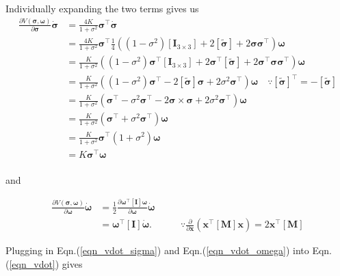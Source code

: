 \documentclass{article}
\begin{document}
Individually expanding the two terms gives us
\begin{equation}
  \label{eqn_vdot_sigma}
  \begin{split}
    \frac{\partial V(\bm{\sigma},\bm{\omega})}{\partial\bm{\sigma}}\dot{\bm{\sigma}}&=\frac{4K}{1+\sigma^{2}}\bm{\sigma}^{\intercal}\dot{\bm{\sigma}}\\
    &=\frac{4K}{1+\sigma^{2}}\bm{\sigma}^{\intercal}\frac{1}{4}\left((1-\sigma^{2})[\bm{I}_{3\times3}]+2[\tilde{\bm{\sigma}}]+2\bm{\sigma}\bm{\sigma}^{\intercal}\right)\bm{\omega}\\
    &=\frac{K}{1+\sigma^{2}}\left((1-\sigma^{2})\bm{\sigma}^{\intercal}[\bm{I}_{3\times3}]+2\bm{\sigma}^{\intercal}[\tilde{\bm{\sigma}}]+2\bm{\sigma}^{\intercal}\bm{\sigma}\bm{\sigma}^{\intercal}\right)\bm{\omega}\\
    &=\frac{K}{1+\sigma^{2}}\left((1-\sigma^{2})\bm{\sigma}^{\intercal}-2[\tilde{\bm{\sigma}}]\bm{\sigma}+2\sigma^{2}\bm{\sigma}^{\intercal}\right)\bm{\omega}\quad\because[\tilde{\bm{\sigma}}]^{\intercal}=-[\tilde{\bm{\sigma}}]\\
    &=\frac{K}{1+\sigma^{2}}\left(\bm{\sigma}^{\intercal}-\sigma^{2}\bm{\sigma}^{\intercal}-2\bm{\sigma}\times\bm{\sigma}+2\sigma^{2}\bm{\sigma}^{\intercal}\right)\bm{\omega}\\
    &=\frac{K}{1+\sigma^{2}}\left(\bm{\sigma}^{\intercal}+\sigma^{2}\bm{\sigma}^{\intercal}\right)\bm{\omega}\\
    &=\frac{K}{1+\sigma^{2}}\bm{\sigma}^{\intercal}\left(1+\sigma^{2}\right)\bm{\omega}\\
    &=K\bm{\sigma}^{\intercal}\bm{\omega}\\
  \end{split}
\end{equation}

and

\begin{equation}
  \label{eqn_vdot_omega}
  \begin{split}
    \frac{\partial V(\bm{\sigma},\bm{\omega})}{\partial\bm{\omega}}\dot{\bm{\omega}}&=\frac{1}{2}\frac{\partial \bm{\omega}^{\intercal}[\bm{I}]\bm{\omega}}{\partial\bm{\omega}}\dot{\bm{\omega}}\\
    &=\bm{\omega}^{\intercal}[\bm{I}]\dot{\bm{\omega}}.\quad\quad\quad\because\frac{\partial}{\partial\bm{x}}(\bm{x}^{\intercal}[\bm{M}]\bm{x})=2\bm{x}^{\intercal}[\bm{M}]
  \end{split}
\end{equation}

Plugging in Eqn.(\ref{eqn_vdot_sigma}) and Eqn.(\ref{eqn_vdot_omega}) into Eqn.(\ref{eqn_vdot}) gives
\end{document}
